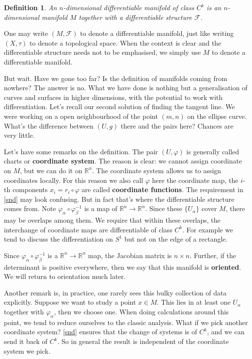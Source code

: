 \documentclass[twoside]{article}
\newtheorem{definition}{Definition}
\begin{document}
			\begin{definition}
				An $n$-dimensional differentiable manifold of class $C^k$ is an $n$-dimensional manifold $M$ together with a differentiable structure $\mathscr{F}$.
			\end{definition}
			One may write $(M,\mathscr{F})$ to denote a differentiable manifold, just like writing $(X,\tau)$ to denote a topological space. When the context is clear and the differentiable structure needs not to be emphasised, we simply use $M$ to denote a differentiable manifold.
			
			But wait. Have we gone too far? Is the definition of manifolds coming from nowhere? The answer is no. What we have done is nothing but a generalisation of curves and surfaces in higher dimensions, with the potential to work with differentiation. Let's recall our second solution of finding the tangent line. We were working on a open neighbourhood of the point $(m,n)$ on the ellipse curve. What's the difference between $(U,g)$ there and the pairs here? Chances are very little.
			
			Let's have some remarks on the definition. The pair $(U,\varphi)$ is generally called charts or \textbf{coordinate system}. The reason is clear: we cannot assign coordinate on $M$, but we can do it on $\mathbb{R}^n$. The coordinate system allows us to assign coordinates locally. For this reason we also call $\varphi$ here the coordinate map, the $i$-th components $x_i = r_i \circ \varphi$ are called \textbf{coordinate functions}. The requirement in \ref{snd} may look confusing. But in fact that's where the differentiable structure comes from. Note $\varphi_\alpha \circ \varphi_\beta^{-1}$ is a map of $\mathbb{R}^n \to \mathbb{R}^n$. Since these $\{U_\alpha\}$ cover $M$, there may be overlaps among them. We require that within these overlaps, the interchange of coordinate maps are differentiable of class $C^k$. For example we tend to discuss the differentiation on $S^1$ but not on the edge of a rectangle.

			Since $\varphi_\alpha \circ \varphi_\beta^{-1}$ is a $\mathbb{R}^n \to \mathbb{R}^n$ map, the Jacobian matrix is $n \times n$. Further, if the determinant is positive everywhere, then we say that this manifold is \textbf{oriented}. We will return to orientation much later.
			
			Another remark is, in practice, one rarely sees this bulky collection of data explicitly. Suppose we want to study a point $x \in M$. This lies in at least one $U_\alpha$ together with $\varphi_\alpha$, then we choose one. When doing calculations around this point, we tend to reduce ourselves to the classic analysis. What if we pick another coordinate system? \ref{snd} ensures that the change of systems is of $C^k$, and we can send it back of $C^k$. So in general the result is independent of the coordinate system we pick. 
			
\end{document}

